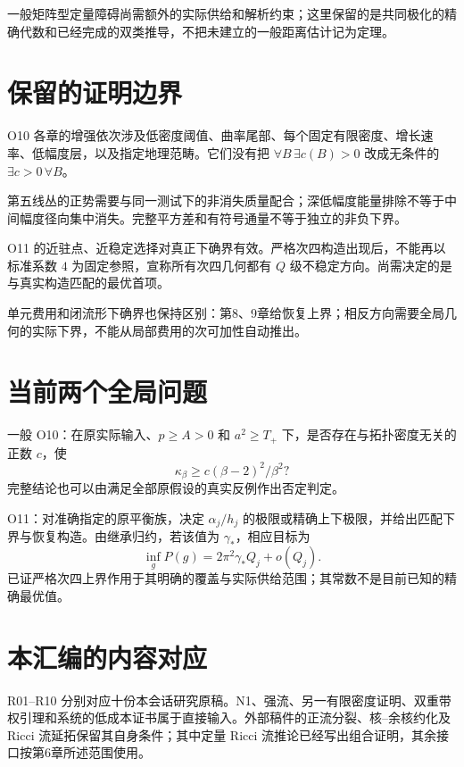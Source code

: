 \documentclass[UTF8,11pt,fontset=none]{ctexart}
\begin{document}
一般矩阵型定量障碍尚需额外的实际供给和解析约束；这里保留的是共同极化的精确代数和已经完成的双类推导，不把未建立的一般距离估计记为定理。

\section{保留的证明边界}\label{ch11:ux4fddux7559ux7684ux8bc1ux660eux8fb9ux754c}

O10 各章的增强依次涉及低密度阈值、曲率尾部、每个固定有限密度、增长速率、低幅度层，以及指定地理范畴。它们没有把 \(\forall B\,\exists c(B)>0\) 改成无条件的 \(\exists c>0\,\forall B\)。

第五线丛的正势需要与同一测试下的非消失质量配合；深低幅度能量排除不等于中间幅度径向集中消失。完整平方差和有符号通量不等于独立的非负下界。

O11 的近驻点、近稳定选择对真正下确界有效。严格次四构造出现后，不能再以标准系数 \(4\) 为固定参照，宣称所有次四几何都有 \(Q\) 级不稳定方向。尚需决定的是与真实构造匹配的最优首项。

单元费用和闭流形下确界也保持区别：第8、9章给恢复上界；相反方向需要全局几何的实际下界，不能从局部费用的次可加性自动推出。

\section{当前两个全局问题}\label{ch11:ux5f53ux524dux4e24ux4e2aux5168ux5c40ux95eeux9898}

一般 O10：在原实际输入、\(p\ge A>0\) 和 \(a^2\ge T_+\) 下，是否存在与拓扑密度无关的正数 \(c\)，使 \[
\kappa_\beta\ge c(\beta-2)^2/\beta^2?
\] 完整结论也可以由满足全部原假设的真实反例作出否定判定。

O11：对准确指定的原平衡族，决定 \(\alpha_j/h_j\) 的极限或精确上下极限，并给出匹配下界与恢复构造。由继承归约，若该值为 \(\gamma_*\)，相应目标为 \[
\inf_gP(g)=2\pi^2\gamma_*Q_j+o(Q_j).
\] 已证严格次四上界作用于其明确的覆盖与实际供给范围；其常数不是目前已知的精确最优值。

\section{本汇编的内容对应}\label{ch11:ux672cux6c47ux7f16ux7684ux5185ux5bb9ux5bf9ux5e94}

R01--R10 分别对应十份本会话研究原稿。N1、强流、另一有限密度证明、双重带权引理和系统的低成本证书属于直接输入。外部稿件的正流分裂、核--余核约化及 Ricci 流延拓保留其自身条件；其中定量 Ricci 流推论已经写出组合证明，其余接口按第6章所述范围使用。
\end{document}
